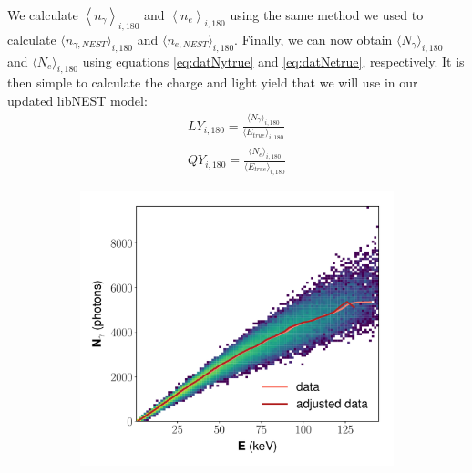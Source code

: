 We calculate $\left\langle n_{\gamma} \right\rangle_{i,180}$ and $\left\langle n_e \right\rangle_{i,180}$ using the same method we used to calculate $\langle n_{\gamma,NEST} \rangle_{i,180}$ and $\langle n_{e,NEST} \rangle_{i,180}$. Finally, we can now obtain $\langle N_{\gamma} \rangle_{i,180}$ and $\langle N_{e} \rangle_{i,180}$ using equations \ref{eq:datNytrue} and \ref{eq:datNetrue}, respectively. It is then simple to calculate the charge and light yield that we will use in our updated libNEST model:
\begin{align}
LY_{i,180}=\frac{\langle N_{\gamma} \rangle_{i,180}}{\langle E_{true} \rangle_{i,180}}\\[1em]
QY_{i,180}=\frac{\langle N_{e} \rangle_{i,180}}{\langle E_{true} \rangle_{i,180}}
\end{align}
\begin{figure}[h!]
\centering
\begin{subfigure}{0.5\textwidth}
  \centering
  \includegraphics[width=\textwidth]{Figures/yields_corrections/C14_LN_heatmap_dat_gfdcm_180Vcm_prelim.pdf}
  \caption{}
\end{subfigure}%
\begin{subfigure}{0.5\textwidth}
  \centering

\end{subfigure}
\end{figure}
